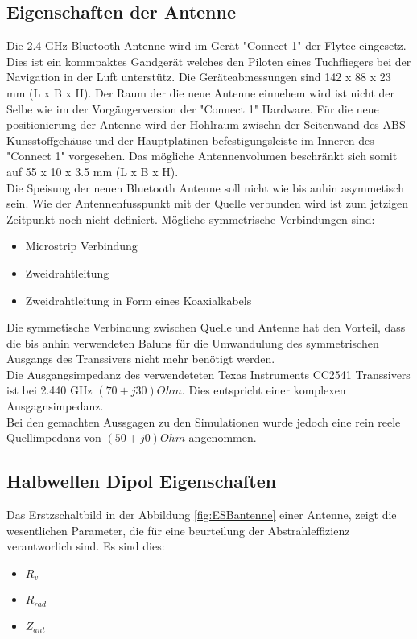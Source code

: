 \subsection{Eigenschaften der Antenne}\label{sec:EigenschaftenAntenne}
Die 2.4 GHz Bluetooth Antenne wird im Gerät "Connect 1" der Flytec eingesetz. Dies ist ein kommpaktes Gandgerät welches den Piloten eines Tuchfliegers bei der Navigation in der Luft unterstütz. Die Geräteabmessungen sind 142 x 88 x 23 mm (L x B x H). Der Raum der die neue Antenne einnehem wird ist nicht der Selbe wie im der Vorgängerversion der "Connect 1" Hardware. Für die neue positionierung der Antenne wird der Hohlraum zwischn der Seitenwand des ABS Kunsstoffgehäuse und der Hauptplatinen befestigungsleiste im Inneren des "Connect 1" vorgesehen. Das mögliche Antennenvolumen beschränkt sich somit auf 55 x 10 x 3.5 mm (L x B x H).\\
Die Speisung der neuen Bluetooth Antenne soll nicht wie bis anhin asymmetisch sein. Wie der Antennenfusspunkt mit der Quelle verbunden wird ist zum jetzigen Zeitpunkt noch nicht definiert. Mögliche symmetrische Verbindungen sind:
\begin{itemize}
\item Microstrip Verbindung  
\item Zweidrahtleitung
\item Zweidrahtleitung in Form eines Koaxialkabels
\end{itemize}

Die symmetische Verbindung zwischen Quelle und Antenne hat den Vorteil, dass die bis anhin verwendeten Baluns für die Umwandulung des symmetrischen Ausgangs des Transsivers nicht mehr benötigt werden. \\
Die Ausgangsimpedanz des verwendeteten Texas Instruments CC2541 Transsivers ist bei 2.440 GHz $(70+j30) Ohm$. Dies entspricht einer komplexen Ausgagnsimpedanz. \\Bei den gemachten Aussgagen zu den Simulationen wurde jedoch eine rein reele Quellimpedanz von $(50+j0) Ohm$ angenommen.

\subsection{Halbwellen Dipol Eigenschaften}
Das Erstzschaltbild in der Abbildung \ref{fig:ESBantenne} einer Antenne, zeigt die wesentlichen Parameter, die für eine beurteilung der Abstrahleffizienz verantworlich sind. Es sind dies:
\begin{itemize}
\item $R_{v}$
\item $R_{rad}$
\item $Z_{ant}$
\end{itemize}

